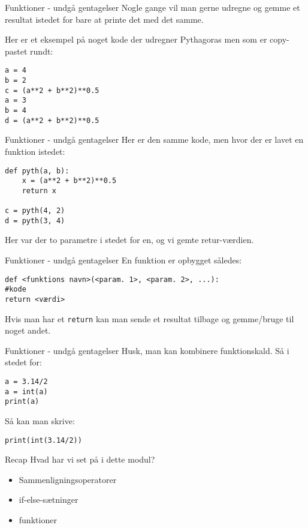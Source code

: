 \documentclass[main.tex]{subfiles}
\begin{document}
\begin{frame}[fragile]{Funktioner - undgå gentagelser}
Nogle gange vil man gerne udregne og gemme et resultat istedet for bare at printe det med det samme.

	Her er et eksempel på noget kode der udregner Pythagoras men som er copy-pastet rundt:
	\begin{lstlisting}[style=python]
a = 4
b = 2
c = (a**2 + b**2)**0.5
a = 3
b = 4
d = (a**2 + b**2)**0.5
	\end{lstlisting}
\end{frame}

\begin{frame}[fragile]{Funktioner - undgå gentagelser}
	Her er den samme kode, men hvor der er lavet en funktion istedet:
	\begin{lstlisting}[style=python]
def pyth(a, b):
	x = (a**2 + b**2)**0.5
	return x

c = pyth(4, 2)
d = pyth(3, 4)
	\end{lstlisting}

	Her var der to parametre i stedet for en, og vi gemte retur-værdien.
\end{frame}


\begin{frame}[fragile]{Funktioner - undgå gentagelser}
En funktion er opbygget således:
\begin{lstlisting}[style=python]
def <funktions navn>(<param. 1>, <param. 2>, ...):
#kode
return <værdi>
\end{lstlisting}
Hvis man har et \texttt{return} kan man sende et resultat tilbage og gemme/bruge til noget andet.
\end{frame}


\begin{frame}[fragile]{Funktioner - undgå gentagelser}
Husk, man kan kombinere funktionskald. Så i stedet for:

\begin{lstlisting}[style=python]
a = 3.14/2
a = int(a)
print(a)
\end{lstlisting}

Så kan man skrive:

\begin{lstlisting}[style=python]
print(int(3.14/2))
\end{lstlisting}
\end{frame}

\begin{frame}[fragile]{Recap}
	Hvad har vi set på i dette modul?
	\pause
	\begin{itemize}
		\item Sammenligningsoperatorer
		\pause
		\item if-else-sætninger
		\pause
		\item funktioner
	\end{itemize}
\end{frame}
\end{document}

